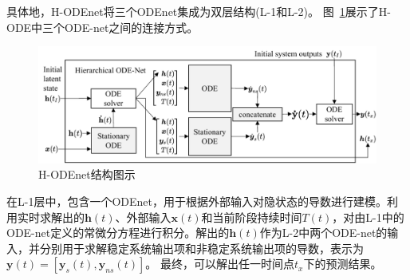 具体地，H-ODEnet将三个ODEnet集成为双层结构(L-1和L-2)。
图~\ref{fig:H_ode}展示了H-ODE中三个ODE-net之间的连接方式。
\begin{figure}
    \centering
    \includegraphics[width=\linewidth]{figures/chapter4/Hode.pdf}
    \caption{H-ODEnet结构图示}
    \label{fig:H_ode}
\end{figure}
在L-1层中，包含一个ODEnet，用于根据外部输入对隐状态的导数进行建模。利用实时求解出的$\boldsymbol h(t)$、外部输入$\boldsymbol x(t)$和当前阶段持续时间$T(t)$，对由L-1中的ODE-net定义的常微分方程进行积分。解出的$\boldsymbol h(t)$作为L-2中两个ODE-net的输入，并分别用于求解稳定系统输出项和非稳定系统输出项的导数，表示为$\boldsymbol y(t)=[\boldsymbol y_s(t), \boldsymbol y_{ns}(t)]$。
最终，可以解出任一时间点$t_x$下的预测结果。

